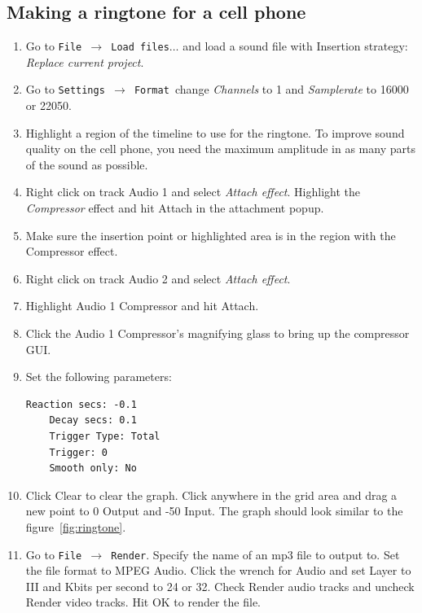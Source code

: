 \subsection{Making a ringtone for a cell phone}%
\label{sub:make_ringtone_phone}

\begin{enumerate}
	\item Go to \texttt{File $\rightarrow$ Load files$\dots$} and load a sound file with Insertion strategy: \textit{Replace current project}.
	\item Go to \texttt{Settings $\rightarrow$ Format }change \textit{Channels} to 1 and \textit{Samplerate} to 16000 or 22050.
	\item Highlight a region of the timeline to use for the ringtone. To improve sound quality on the cell
	phone, you need the maximum amplitude in as many parts of the sound as possible.
	\item Right click on track Audio 1 and select \textit{Attach effect}. Highlight the \textit{Compressor} effect and hit
	Attach in the attachment popup.
	\item Make sure the insertion point or highlighted area is in the region with the Compressor effect.
	\item Right click on track Audio 2 and select \textit{Attach effect}.
	\item Highlight Audio 1 Compressor and hit Attach.
	\item Click the Audio 1 Compressor's magnifying glass to bring up the compressor GUI.
	\item Set the following parameters:
	\begin{lstlisting}[numbers=none]
	Reaction secs: -0.1
	Decay secs: 0.1
	Trigger Type: Total
	Trigger: 0
	Smooth only: No
	\end{lstlisting}
	\item Click Clear to clear the graph. Click anywhere in the grid area and drag a new point to 0 Output
	and -50 Input. The graph should look similar to the figure~\ref{fig:ringtone}.
	\item Go to \texttt{File $\rightarrow$ Render}. Specify the name of an mp3 file to output to. Set the file format to MPEG
	Audio. Click the wrench for Audio and set Layer to III and Kbits per second to 24 or 32. Check
	Render audio tracks and uncheck Render video tracks. Hit OK to render the file.
\end{enumerate}

